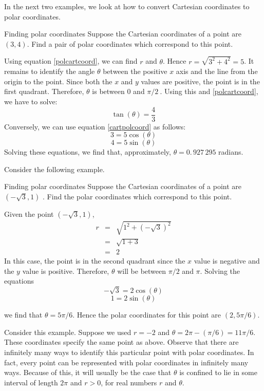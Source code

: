 In the next two examples, we look at how to convert Cartesian coordinates to polar coordinates. 

\begin{example}{Finding polar coordinates}{}
Suppose the Cartesian coordinates of a point are $\left( 3,4\right) $. Find
a pair of polar coordinates which correspond to this point.
\end{example}

\begin{solution}
Using equation \ref{polcartcoord}, we can find $r$ and $\theta$. Hence $r=\sqrt{3^{2}+4^{2}}=5$. It remains to identify the angle $\theta$ between the positive $x$ axis and the line from the origin to the point. Since both the $x$ and $y$ values are positive, the point is in the
first quadrant. Therefore, $\theta$ is between $0$ and $\pi /2\ $. 
Using this and \ref{polcartcoord}, we have to solve:
\[
\tan\left(\theta \right)=\frac{4}{3}
\]
Conversely, we can use equation \ref{cartpolcoord} as follows:
\[
3=5\cos \left( \theta \right) 
\]
\[
4 = 5\sin \left( \theta \right) 
\]
Solving these equations, we find that, 
approximately, $\theta =0.\, 927\,295$ radians.
\end{solution}

Consider the following example.

\begin{example}{Finding polar coordinates}{}
Suppose the Cartesian coordinates of a point are $\left( -\sqrt{3},1\right)$
. Find the polar coordinates which correspond to this point.
\end{example}

\begin{solution}
Given the point $\left( -\sqrt{3}, 1\right)$, 
\begin{eqnarray*}
r &=& \sqrt{ 1^2 + (-\sqrt{3})^2}\\
&=& \sqrt{1 + 3}\\
&=&2
\end{eqnarray*}
 In this case, the point is in the second quadrant since the $x$ value is negative and the $y$ value is positive. Therefore, $\theta$ will be between $\pi/2$ and $\pi$.
Solving the equations
\[
-\sqrt{3}= 2 \cos \left(\theta\right)
\]
\[
1 = 2 \sin \left( \theta\right) 
\]

we find that $\theta = 5\pi /6.$
Hence the polar coordinates for this point are $\left(2, 5\pi /6 \right)$.
\end{solution}

Consider this example. Suppose we used $r=-2$ and $\theta =2\pi -\left( \pi /6\right) = 11\pi /6 $. These coordinates specify the same point as above. Observe that there are infinitely many ways to identify this
particular point with polar coordinates. In fact, every point can be represented with polar coordinates in infinitely many ways. Because of this, it will usually be
the case that $\theta $ is confined to lie in some interval
of length $2\pi $ and $r>0$, for real numbers $r$ and $\theta $. 

